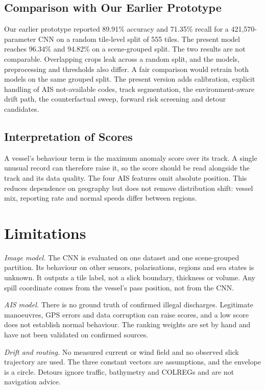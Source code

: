 \documentclass[conference]{IEEEtran}
\begin{document}
\subsection{Comparison with Our Earlier Prototype}
Our earlier prototype reported 89.91\% accuracy and 71.35\% recall for a 421,570-parameter
CNN on a random tile-level split of 555 tiles. The present model reaches 96.34\% and 94.82\%
on a scene-grouped split. The two results are not comparable. Overlapping crops leak across
a random split, and the models, preprocessing and thresholds also differ. A fair comparison
would retrain both models on the same grouped split. The present version adds calibration,
explicit handling of AIS not-available codes, track segmentation, the environment-aware drift
path, the counterfactual sweep, forward risk screening and detour candidates.

\subsection{Interpretation of Scores}
A vessel's behaviour term is the maximum anomaly score over its track. A single unusual
record can therefore raise it, so the score should be read alongside the track and its
data quality. The four AIS features omit absolute position. This reduces dependence on
geography but does not remove distribution shift: vessel mix, reporting rate and normal
speeds differ between regions.

\section{Limitations}

\emph{Image model.} The CNN is evaluated on one dataset and one scene-grouped partition.
Its behaviour on other sensors, polarisations, regions and sea states is unknown. It
outputs a tile label, not a slick boundary, thickness or volume. Any spill coordinate
comes from the vessel's pass position, not from the CNN.

\emph{AIS model.} There is no ground truth of confirmed illegal discharges. Legitimate
manoeuvres, GPS errors and data corruption can raise scores, and a low score does not
establish normal behaviour. The ranking weights are set by hand and have not been
validated on confirmed sources.

\emph{Drift and routing.} No measured current or wind field and no observed slick
trajectory are used. The three constant vectors are assumptions, and the envelope is a
circle. Detours ignore traffic, bathymetry and COLREGs and are not navigation advice.
\end{document}
